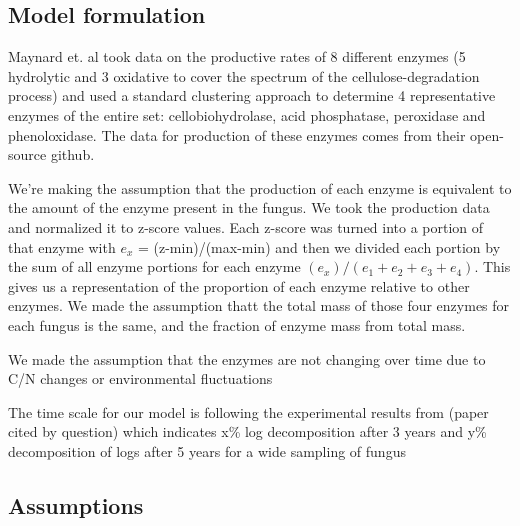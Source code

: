 \documentclass[12pt]{article}
\begin{document}
\begin{multicols}{2}
\section{Model formulation}
Maynard et. al took data on the productive rates of 8 different enzymes (5 hydrolytic and 3 oxidative to cover the spectrum of the cellulose-degradation process) and used a standard clustering approach to determine 4 representative enzymes of the entire set: cellobiohydrolase, acid phosphatase, peroxidase and phenoloxidase. The data for production of these enzymes comes from their open-source github. 

We're making the assumption that the production of each enzyme is  equivalent to the amount of the enzyme present in the fungus. We took the production data and normalized it to z-score values. Each z-score was turned into a portion of that enzyme with $e_x$ = (z-min)/(max-min) and then we divided each portion by the sum of all enzyme portions for each enzyme $(e_x)/(e_1+e_2+e_3+e_4)$. This gives us a representation of the proportion of each enzyme relative to other enzymes. We made the assumption thatt the total mass of those four enzymes for each fungus is the same, and the fraction of enzyme mass from total mass.

We made the assumption that the enzymes are not changing over time due to C/N changes or environmental fluctuations

The time scale for our model is following the experimental results from (paper cited by question) which indicates x\% log decomposition after 3 years and y\% decomposition of logs after 5 years for a wide sampling of fungus

\subsection{Assumptions}


\end{multicols}
\end{document}
